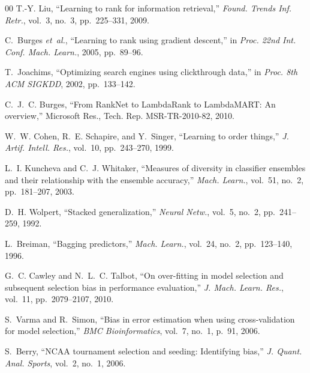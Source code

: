 \documentclass[conference]{IEEEtran}
\begin{document}
\begin{thebibliography}{00}
T.-Y. Liu, ``Learning to rank for information retrieval,'' \emph{Found. Trends Inf. Retr.}, vol.~3, no.~3, pp.~225--331, 2009.

C.~Burges \emph{et~al.}, ``Learning to rank using gradient descent,'' in \emph{Proc. 22nd Int. Conf. Mach. Learn.}, 2005, pp.~89--96.

T.~Joachims, ``Optimizing search engines using clickthrough data,'' in \emph{Proc. 8th ACM SIGKDD}, 2002, pp.~133--142.

C.~J.~C. Burges, ``From RankNet to LambdaRank to LambdaMART: An overview,'' Microsoft Res., Tech. Rep. MSR-TR-2010-82, 2010.

W.~W. Cohen, R.~E. Schapire, and Y.~Singer, ``Learning to order things,'' \emph{J. Artif. Intell. Res.}, vol.~10, pp.~243--270, 1999.

L.~I. Kuncheva and C.~J. Whitaker, ``Measures of diversity in classifier ensembles and their relationship with the ensemble accuracy,'' \emph{Mach. Learn.}, vol.~51, no.~2, pp.~181--207, 2003.

D.~H. Wolpert, ``Stacked generalization,'' \emph{Neural Netw.}, vol.~5, no.~2, pp.~241--259, 1992.

L.~Breiman, ``Bagging predictors,'' \emph{Mach. Learn.}, vol.~24, no.~2, pp.~123--140, 1996.

G.~C. Cawley and N.~L.~C. Talbot, ``On over-fitting in model selection and subsequent selection bias in performance evaluation,'' \emph{J. Mach. Learn. Res.}, vol.~11, pp.~2079--2107, 2010.

S.~Varma and R.~Simon, ``Bias in error estimation when using cross-validation for model selection,'' \emph{BMC Bioinformatics}, vol.~7, no.~1, p.~91, 2006.

S.~Berry, ``NCAA tournament selection and seeding: Identifying bias,'' \emph{J. Quant. Anal. Sports}, vol.~2, no.~1, 2006.

\end{thebibliography}
\end{document}

